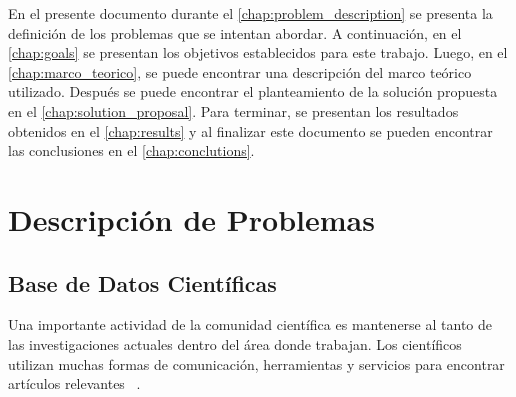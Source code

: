 \documentclass[12pt,oneside,letterpaper]{book}
\newcommand{\eng}[1]{\textit{#1}\xspace}			%
\theoremstyle{definition}
\begin{document}
En el presente documento durante el \autoref{chap:problem_description} se presenta la definición de los problemas que se intentan abordar. A continuación, en el \autoref{chap:goals} se presentan los objetivos establecidos para este trabajo. Luego, en el \autoref{chap:marco_teorico}, se puede encontrar una descripción del marco teórico utilizado. Después se puede encontrar el planteamiento de la solución propuesta en el \autoref{chap:solution_proposal}. Para terminar, se presentan los resultados obtenidos en el \autoref{chap:results} y al finalizar este documento se pueden encontrar las conclusiones en el \autoref{chap:conclutions}.

\chapter{Descripción de Problemas}
\label{chap:problem_description}
\section{Base de Datos Científicas}
\label{sec:base_de_datos_cientificas}

Una importante actividad de la comunidad científica es mantenerse al tanto de las investigaciones actuales dentro
del área donde trabajan. Los científicos utilizan muchas formas de comunicación, herramientas y servicios para encontrar artículos relevantes ~\cite{hoggan2002, tenopir2001}.
\end{document}
